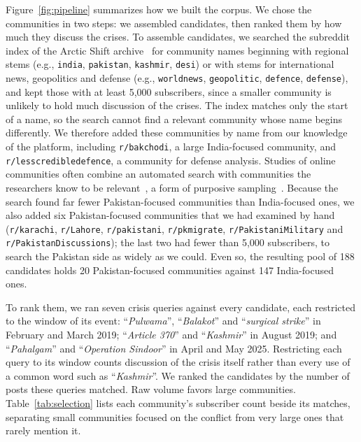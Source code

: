 Figure~\ref{fig:pipeline} summarizes how we built the corpus. We chose the communities in two steps: we assembled candidates, then ranked them by how much they discuss the crises. To assemble candidates, we searched the subreddit index of the Arctic Shift archive~\cite{arcticshift2026software} for community names beginning with regional stems (e.g., \texttt{india}, \texttt{pakistan}, \texttt{kashmir}, \texttt{desi}) or with stems for international news, geopolitics and defense (e.g., \texttt{worldnews}, \texttt{geopolitic}, \texttt{defence}, \texttt{defense}), and kept those with at least 5,000 subscribers, since a smaller community is unlikely to hold much discussion of the crises. The index matches only the start of a name, so the search cannot find a relevant community whose name begins differently. We therefore added these communities by name from our knowledge of the platform, including \texttt{r/bakchodi}, a large India-focused community, and \texttt{r/lesscredibledefence}, a community for defense analysis. Studies of online communities often combine an automated search with communities the researchers know to be relevant~\cite{ribeiro2020auditing,hortaribeiro2021manosphere}, a form of purposive sampling~\cite{palinkas2015purposeful}. Because the search found far fewer Pakistan-focused communities than India-focused ones, we also added six Pakistan-focused communities that we had examined by hand (\texttt{r/karachi}, \texttt{r/Lahore}, \texttt{r/pakistani}, \texttt{r/pkmigrate}, \texttt{r/PakistaniMilitary} and \texttt{r/PakistanDiscussions}); the last two had fewer than 5,000 subscribers, to search the Pakistan side as widely as we could. Even so, the resulting pool of 188 candidates holds 20 Pakistan-focused communities against 147 India-focused ones. 

To rank them, we ran seven crisis queries against every candidate, each restricted to the window of its event: ``\textit{Pulwama}'', ``\textit{Balakot}'' and ``\textit{surgical strike}'' in February and March 2019; ``\textit{Article 370}'' and ``\textit{Kashmir}'' in August 2019; and ``\textit{Pahalgam}'' and ``\textit{Operation Sindoor}'' in April and May 2025. Restricting each query to its window counts discussion of the crisis itself rather than every use of a common word such as ``\textit{Kashmir}''. We ranked the candidates by the number of posts these queries matched. Raw volume favors large communities. Table~\ref{tab:selection} lists each community's subscriber count beside its matches, separating small communities focused on the conflict from very large ones that rarely mention it.

